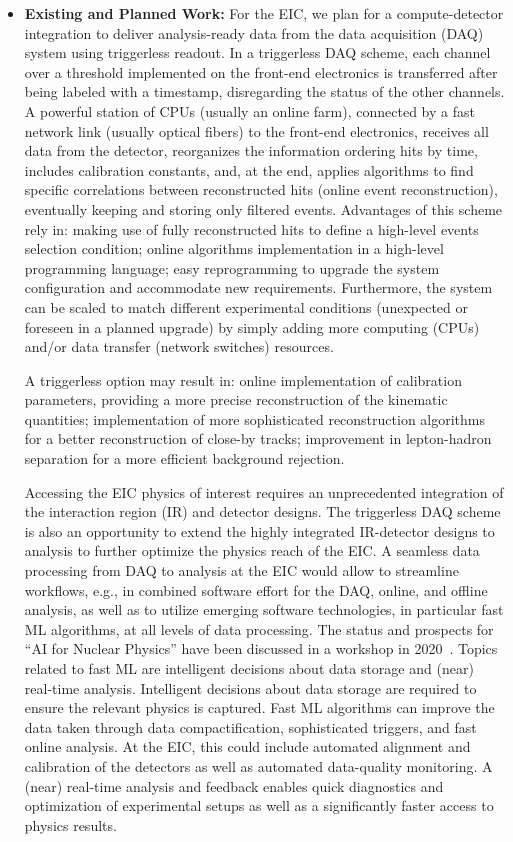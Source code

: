 \begin{itemize}
        \item \textbf{Existing and Planned Work:}
        For the EIC, we plan for a compute-detector integration to deliver analysis-ready data from the data acquisition (DAQ) system using triggerless readout. In a triggerless DAQ scheme, each channel over a threshold implemented on the front-end electronics is transferred after being labeled with a timestamp, disregarding the status of the other channels. A powerful station of CPUs (usually an online farm), connected by a fast network link (usually optical fibers) to the front-end electronics, receives all data from the detector, reorganizes the information ordering hits by time, includes calibration constants, and, at the end, applies algorithms to find specific correlations between reconstructed hits (online event reconstruction), eventually keeping and storing only filtered events. Advantages of this scheme rely in: making use of fully reconstructed hits to define a high-level events selection condition; online algorithms implementation in a high-level programming language; easy reprogramming to upgrade the system configuration and accommodate new requirements. Furthermore, the system can be scaled to match different experimental conditions (unexpected or foreseen in a planned upgrade) by simply adding more computing (CPUs) and/or data transfer (network switches) resources. 

        A triggerless option may result in: online implementation of calibration parameters, providing a more precise reconstruction of the kinematic quantities; implementation of more sophisticated reconstruction algorithms for a better reconstruction of close-by tracks; improvement in lepton-hadron separation for a more efficient background rejection.
        
         Accessing the EIC physics of interest requires an unprecedented integration of the interaction region (IR) and detector designs. The triggerless DAQ scheme is also an opportunity to extend the highly integrated IR-detector designs to analysis to further optimize the physics reach of the EIC. A seamless data processing from DAQ to analysis at the EIC would allow to streamline workflows, e.g., in combined software effort for the DAQ, online, and offline analysis, as well as to utilize emerging software technologies, in particular fast ML algorithms, at all levels of data processing. The status and prospects for “AI for Nuclear Physics” have been discussed in a workshop in 2020~\cite{Bedaque:2020pct}. Topics related to fast ML are intelligent decisions about data storage and (near) real-time analysis. Intelligent decisions about data storage are required to ensure the relevant physics is captured. Fast ML algorithms can improve the data taken through data compactification, sophisticated triggers, and fast online analysis. At the EIC, this could include automated alignment and calibration of the detectors as well as automated data-quality monitoring. A (near) real-time analysis and feedback enables quick diagnostics and optimization of experimental setups as well as a significantly faster access to physics results. 
        

        
\end{itemize}
